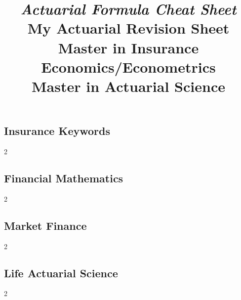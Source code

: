 \documentclass[a4paper]{article}
\title{
\author{}
\emph{Actuarial Formula Cheat Sheet}\\
My Actuarial Revision Sheet\\\medskip\small
Master in Insurance Economics/Econometrics\\
Master in Actuarial Science}
\theoremstyle{sansparenthese}
\begin{document}
\maketitle
%
 \setcounter{higher}{1}
\begin{center}

\end{center}
\newpage

\begin{center}
	\bigskip

\section*{Insurance Keywords}
    \medskip
\end{center}


\begin{multicols}{2}
	

\end{multicols}

\newpage
\begin{center}
	\section*{Financial Mathematics}
	\medskip
\end{center}


\begin{multicols}{2}
	
	
\end{multicols}

\newpage
\begin{center}
\section*{Market Finance}
    \medskip
\end{center}

\begin{multicols}{2}


\end{multicols}

\newpage
\begin{center}
\section*{Life Actuarial Science}
    \medskip
\end{center}

\begin{multicols}{2}
	

\end{multicols}
\end{document}

